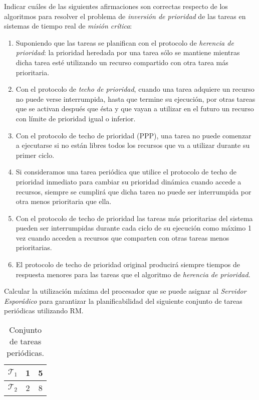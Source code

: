 \begin{ejercicio}\label{ej:rel4_12}
    Indicar cuáles de las siguientes afirmaciones son correctas respecto de los algoritmos para resolver el problema de \textit{inversión de prioridad} de las tareas en sistemas de tiempo real de \textit{misión crítica}:
    \begin{enumerate}[label=(\alph*)]
        \item Suponiendo que las tareas se planifican con el protocolo de \textit{herencia de prioridad}: la prioridad heredada por una tarea sólo se mantiene mientras dicha tarea esté utilizando un recurso compartido con otra tarea más prioritaria.
        \item Con el protocolo de \textit{techo de prioridad}, cuando una tarea adquiere un recurso no puede verse interrumpida, hasta que termine su ejecución, por otras tareas que se activan después que ésta y que vayan a utilizar en el futuro un recurso con límite de prioridad igual o inferior.
        \item Con el protocolo de techo de prioridad (PPP), una tarea no puede comenzar a ejecutarse si no están libres todos los recursos que va a utilizar durante su primer ciclo.
        \item Si consideramos una tarea periódica que utilice el protocolo de techo de prioridad inmediato para cambiar su prioridad dinámica cuando accede a recursos, siempre se cumplirá que dicha tarea no puede ser interrumpida por otra menos prioritaria que ella.
        \item Con el protocolo de techo de prioridad las tareas más prioritarias del sistema pueden ser interrumpidas durante cada ciclo de su ejecución como máximo 1 vez cuando acceden a recursos que comparten con otras tareas menos prioritarias.
        \item El protocolo de techo de prioridad original producirá siempre tiempos de respuesta menores para las tareas que el algoritmo de \textit{herencia de prioridad}.
    \end{enumerate}
\end{ejercicio}

\begin{ejercicio}\label{ej:rel4_13}
    Calcular la utilización máxima del procesador que se puede asignar al \textit{Servidor Esporádico} para garantizar la planificabilidad del siguiente conjunto de tareas periódicas utilizando RM.
    \begin{table}[H]
    \centering
    \begin{tabular}{|c|c|c|}
        \hline
        $\mathcal{T}_1$ & 1 & 5 \\
        \hline
        $\mathcal{T}_2$ & 2 & 8 \\
        \hline
    \end{tabular}
    \caption{Conjunto de tareas periódicas.}
    \label{tab:4_13}
    \end{table}
\end{ejercicio}

